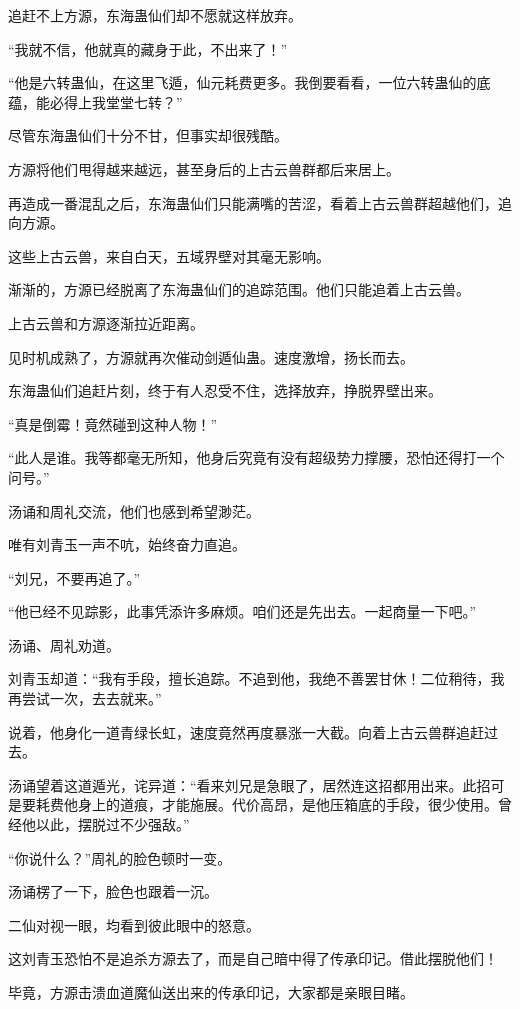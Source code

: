 \begin{this_body}
追赶不上方源，东海蛊仙们却不愿就这样放弃。

“我就不信，他就真的藏身于此，不出来了！”

“他是六转蛊仙，在这里飞遁，仙元耗费更多。我倒要看看，一位六转蛊仙的底蕴，能必得上我堂堂七转？”

尽管东海蛊仙们十分不甘，但事实却很残酷。

方源将他们甩得越来越远，甚至身后的上古云兽群都后来居上。

再造成一番混乱之后，东海蛊仙们只能满嘴的苦涩，看着上古云兽群超越他们，追向方源。

这些上古云兽，来自白天，五域界壁对其毫无影响。

渐渐的，方源已经脱离了东海蛊仙们的追踪范围。他们只能追着上古云兽。

上古云兽和方源逐渐拉近距离。

见时机成熟了，方源就再次催动剑遁仙蛊。速度激增，扬长而去。

东海蛊仙们追赶片刻，终于有人忍受不住，选择放弃，挣脱界壁出来。

“真是倒霉！竟然碰到这种人物！”

“此人是谁。我等都毫无所知，他身后究竟有没有超级势力撑腰，恐怕还得打一个问号。”

汤诵和周礼交流，他们也感到希望渺茫。

唯有刘青玉一声不吭，始终奋力直追。

“刘兄，不要再追了。”

“他已经不见踪影，此事凭添许多麻烦。咱们还是先出去。一起商量一下吧。”

汤诵、周礼劝道。

刘青玉却道：“我有手段，擅长追踪。不追到他，我绝不善罢甘休！二位稍待，我再尝试一次，去去就来。”

说着，他身化一道青绿长虹，速度竟然再度暴涨一大截。向着上古云兽群追赶过去。

汤诵望着这道遁光，诧异道：“看来刘兄是急眼了，居然连这招都用出来。此招可是要耗费他身上的道痕，才能施展。代价高昂，是他压箱底的手段，很少使用。曾经他以此，摆脱过不少强敌。”

“你说什么？”周礼的脸色顿时一变。

汤诵楞了一下，脸色也跟着一沉。

二仙对视一眼，均看到彼此眼中的怒意。

这刘青玉恐怕不是追杀方源去了，而是自己暗中得了传承印记。借此摆脱他们！

毕竟，方源击溃血道魔仙送出来的传承印记，大家都是亲眼目睹。


\end{this_body}

